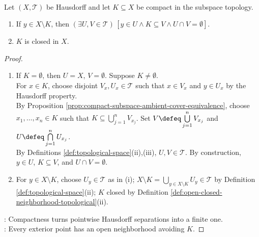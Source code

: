 \begin{proposition} \label{prop:compact-subsets-hausdorff-closed} \\
Let $(X,\mathcal{T})$ be Hausdorff and let $K\subseteq X$ be compact in the subspace topology.
\begin{enumerate}[label=(\roman*)]
\setlength{\itemsep}{0pt}
\item If $y\in X\setminus K$, then $(\exists U,V\in\mathcal{T})\,[y\in U\land K\subseteq V\land U\cap V=\emptyset]$.
\item $K$ is closed in $X$.
\end{enumerate}
\begin{proof}
\begin{enumerate}[label=(\roman*)]
\setlength{\itemsep}{0pt}
\item If $K=\emptyset$, then $U=X$, $V=\emptyset$. Suppose $K\neq\emptyset$.\\
For $x\in K$, choose disjoint $V_x,U_x\in\mathcal{T}$ such that $x\in V_x$ and $y\in U_x$ by the Hausdorff property.\\
By Proposition \ref{prop:compact-subspace-ambient-cover-equivalence}, choose $x_1,\ldots,x_n\in K$ such that $K\subseteq\bigcup_{j=1}^nV_{x_j}$. Set $V\defeq\bigcup\limits_{j=1}^nV_{x_j}$ and $U\defeq\bigcap\limits_{j=1}^nU_{x_j}$.\\
By Definitions \ref{def:topological-space}(ii),(iii), $U,V\in\mathcal{T}$. By construction, $y\in U$, $K\subseteq V$, and $U\cap V=\emptyset$.
\item For $y\in X\setminus K$, choose $U_y\in\mathcal{T}$ as in (i); $X\setminus K=\bigcup\limits_{y\in X\setminus K}U_y\in\mathcal{T}$ by Definition \ref{def:topological-space}(ii); $K$ closed by Definition \ref{def:open-closed-neighborhood-topological}(ii).
\end{enumerate}
: Compactness turns pointwise Hausdorff separations into a finite one.\\
: Every exterior point has an open neighborhood avoiding $K$.
\end{proof}
\end{proposition}

